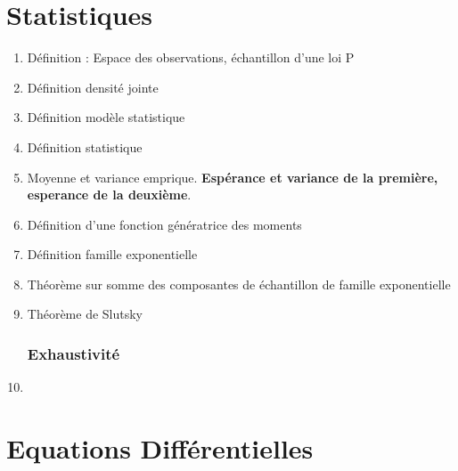 \documentclass{article}
\begin{document}
\part{Statistiques}
\begin{enumerate}
\section{Introduction}
	\item Définition : Espace des observations, échantillon d'une loi P
	\item Définition densité jointe
	\item Définition modèle statistique
	\item Définition statistique
	\item Moyenne et variance emprique. \textbf{Espérance et variance de la première, esperance de la deuxième}.
	\item Définition d'une fonction génératrice des moments
	\item Définition famille exponentielle
	\item Théorème sur somme des composantes de échantillon de famille exponentielle
	\item Théorème de Slutsky
\section{Exhaustivité}
	\item 
\end{enumerate}


\newpage
\part{Equations Différentielles}
\end{document}
